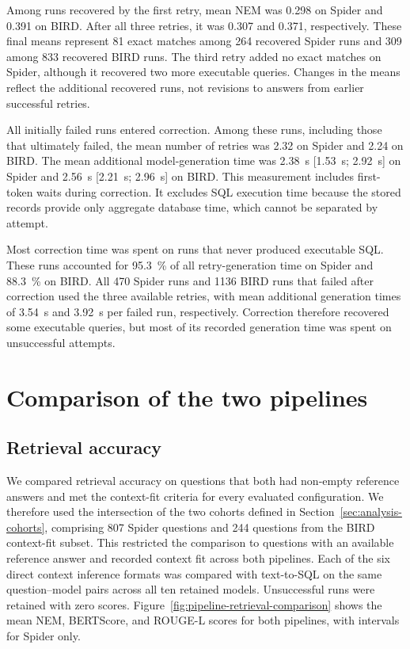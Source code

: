 

Among runs recovered by the first retry, mean NEM was \num{0.298} on Spider and \num{0.391} on BIRD.
After all three retries, it was \num{0.307} and \num{0.371}, respectively. These final means represent
\num{81} exact matches among \num{264} recovered Spider runs and \num{309} among \num{833} recovered
BIRD runs. The third retry added no exact matches on Spider, although it recovered two more executable
queries. Changes in the means reflect the additional recovered runs, not revisions to answers from earlier
successful retries.

All initially failed runs entered correction. Among these runs, including those that ultimately failed, the
mean number of retries was \num{2.32} on Spider and \num{2.24} on BIRD. The mean additional model-generation
time was \qty{2.38}{\second} [\qty{1.53}{\second}; \qty{2.92}{\second}] on Spider and \qty{2.56}{\second}
[\qty{2.21}{\second}; \qty{2.96}{\second}] on BIRD. This measurement includes first-token waits during correction. It
excludes SQL execution time because the stored records provide only aggregate database time, which cannot be
separated by attempt.

Most correction time was spent on runs that never produced executable SQL. These runs accounted for
\qty{95.3}{\percent} of all retry-generation time on Spider and \qty{88.3}{\percent} on BIRD. All \num{470}
Spider runs and \num{1136} BIRD runs that failed after correction used the three available retries, with mean
additional generation times of \qty{3.54}{\second} and \qty{3.92}{\second} per failed run, respectively.
Correction therefore recovered some executable queries, but most of its recorded generation time was spent on
unsuccessful attempts.

\section{Comparison of the two pipelines} \label{sec:common-cohort-comparison}

\subsection{Retrieval accuracy}

We compared retrieval accuracy on questions that both had non-empty reference answers and met the
context-fit criteria for every evaluated configuration. We therefore used the intersection of the two
cohorts defined in Section~\ref{sec:analysis-cohorts}, comprising \num{807} Spider questions and \num{244}
questions from the BIRD context-fit subset. This restricted the comparison to questions with an available
reference answer and recorded context fit across both pipelines. Each of the six direct context inference
formats was compared with text-to-SQL on the same question--model pairs across all ten retained models.
Unsuccessful runs were retained with zero scores. Figure~\ref{fig:pipeline-retrieval-comparison} shows the mean NEM,
BERTScore, and ROUGE-L scores for both pipelines, with intervals for Spider only.

